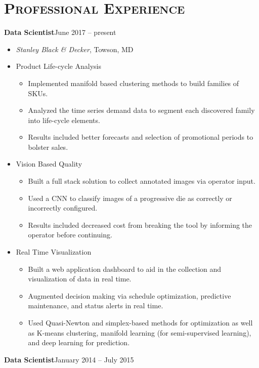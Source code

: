 \documentclass[10pt]{article}
\begin{document}
\section*{\textsc{Professional Experience}}
\textbf{Data Scientist}\hfill June 2017 -- present
\begin{itemize}[noitemsep]
    \item[] \textit{Stanley Black \& Decker}, Towson, MD\vspace{2ex}
    \item[] Product Life-cycle Analysis
    \begin {itemize}[noitemsep]
        \item Implemented manifold based clustering methods to build families of SKUs.
        \item Analyzed the time series demand data to segment each discovered family into life-cycle elements.
        \item Results included better forecasts and selection of promotional periods to bolster sales.
    \end{itemize}
    \item[] Vision Based Quality
    \begin{itemize}[noitemsep]
        \item Built a full stack solution to collect annotated images via operator input.
        \item Used a CNN to classify images of a progressive die as correctly or incorrectly configured.
        \item Results included decreased cost from breaking the tool by informing the operator before continuing.
    \end{itemize}
    \item[] Real Time Visualization
    \begin{itemize}[noitemsep]
        \item Built a web application dashboard to aid in the collection and visualization of data in real time.
        \item Augmented decision making via schedule optimization, predictive maintenance, and status alerts in real time.
        \item Used Quasi-Newton and simplex-based methods for optimization as well as K-means clustering, manifold learning (for semi-supervised learning), and deep learning for prediction.
    \end{itemize}
\end{itemize}
\textbf{Data Scientist}\hfill January 2014 -- July 2015
\end{document}
